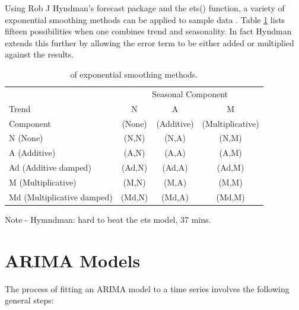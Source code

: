 Using Rob J Hyndman's forecast package and the ets() function, a variety of exponential smoothing methods can be applied to sample data \citep{Hyndman08automatictime}. Table \ref{tab:tax_em} lists fifteen possibilities when one combines trend and seasonality. In fact Hyndman extends this further by allowing the error term to be either added or multiplied against the results. 

\begin{table}[ht]
\centering
\caption[Taxonomy of exponential smoothing methods.]{of exponential smoothing methods.} 
\label{tab:tax_em}
\begin{tabular}{lccc}
  \toprule 
            & \multicolumn{3}{c}{Seasonal Component} \\
  \cmidrule(r){2-4}
  Trend     & N      & A          & M       \\ 
  Component &(None)  &(Additive)  & (Multiplicative)  \\
  \midrule 
  N (None) & (N,N)&(N,A)&(N,M)  \\ 
  A (Additive) & (A,N)&	(A,A)&(A,M)  \\ 
  Ad (Additive damped) &(Ad,N)&(Ad,A)&(Ad,M) \\ 
  M (Multiplicative) &(M,N)&(M,A)&(M,M)  \\ 
  Md (Multiplicative damped) &(Md,N)&(Md,A)&(Md,M) \\ 
   \bottomrule \end{tabular}
\end{table}

Note - Hymndman: hard to beat the ets model, 37 mins.


\newpage
\section{ARIMA Models}
\label{arima_models}

The process of fitting an ARIMA model to a time series involves the following general steps:

